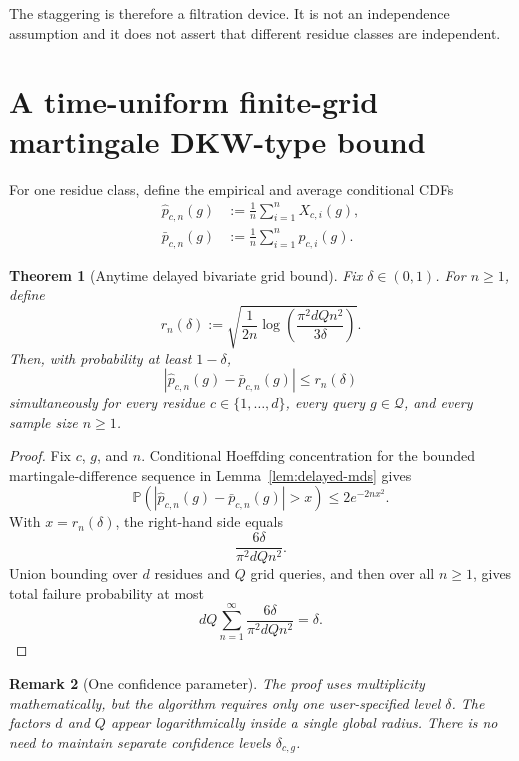 \documentclass[11pt]{article}
\newtheorem{theorem}{Theorem}
\newtheorem{remark}[theorem]{Remark}
\newcommand{\Pp}{\mathbb{P}}
\newcommand{\Q}{\mathcal{Q}}
\newcommand{\1}{\mathbf{1}}
\begin{document}
The staggering is therefore a filtration device.  It is not an independence
assumption and it does not assert that different residue classes are
independent.

\section{A time-uniform finite-grid martingale DKW-type bound}

For one residue class, define the empirical and average conditional CDFs
\begin{align}
    \widehat p_{c,n}(g)
    &:=
    \frac1n\sum_{i=1}^n X_{c,i}(g),
    \label{eq:residue-empirical}
    \\
    \bar p_{c,n}(g)
    &:=
    \frac1n\sum_{i=1}^n p_{c,i}(g).
    \label{eq:residue-target}
\end{align}

\begin{theorem}[Anytime delayed bivariate grid bound]
\label{thm:single-edge-anytime}
Fix $\delta\in(0,1)$.  For $n\ge1$, define
\begin{equation}
    r_n(\delta)
    :=
    \sqrt{
        \frac{1}{2n}
        \log\!\left(
            \frac{\pi^2 dQ n^2}{3\delta}
        \right)
    }.
    \label{eq:rn-single}
\end{equation}
Then, with probability at least $1-\delta$,
\begin{equation}
    \left|
        \widehat p_{c,n}(g)-\bar p_{c,n}(g)
    \right|
    \le
    r_n(\delta)
    \label{eq:residue-band}
\end{equation}
simultaneously for every residue $c\in\{1,\ldots,d\}$, every query
$g\in\Q$, and every sample size $n\ge1$.
\end{theorem}

\begin{proof}
Fix $c$, $g$, and $n$.  Conditional Hoeffding concentration for the bounded
martingale-difference sequence in Lemma~\ref{lem:delayed-mds} gives
\[
    \Pp\!\left(
        \left|
            \widehat p_{c,n}(g)-\bar p_{c,n}(g)
        \right|>x
    \right)
    \le
    2e^{-2nx^2}.
\]
With $x=r_n(\delta)$, the right-hand side equals
\[
    \frac{6\delta}{\pi^2 dQ n^2}.
\]
Union bounding over $d$ residues and $Q$ grid queries, and then over all
$n\ge1$, gives total failure probability at most
\[
    dQ\sum_{n=1}^\infty
    \frac{6\delta}{\pi^2 dQ n^2}
    =
    \delta.
\]
\end{proof}

\begin{remark}[One confidence parameter]
The proof uses multiplicity mathematically, but the algorithm requires only one
user-specified level $\delta$.  The factors $d$ and $Q$ appear logarithmically
inside a single global radius.  There is no need to maintain separate
confidence levels $\delta_{c,g}$.
\end{remark}
\end{document}
